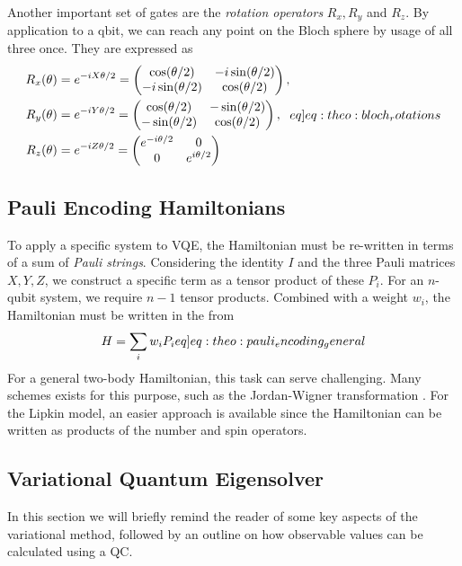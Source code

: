 Another important set of gates are the \textit{rotation operators} $R_x, R_y$ and $R_z$. By application to a qbit, we can reach any point on the Bloch sphere by usage of all three once. They are expressed as
\begin{align}
    \begin{split}
        R_x(\theta) &= \exp{-iX\theta/2} = \begin{pmatrix}
            \cos(\theta/2) & -i\sin(\theta/2) \\
            -i\sin(\theta/2) & \cos(\theta/2)
        \end{pmatrix}, \\
        R_y(\theta) &= \exp{-iY\theta/2} = \begin{pmatrix}
            \cos(\theta/2) & -\sin(\theta/2) \\
            -\sin(\theta/2) & \cos(\theta/2)
        \end{pmatrix}, \\
        R_z(\theta) &= \exp{-iZ\theta/2} = \begin{pmatrix}
            \exp{-i\theta/2} & 0 \\
            0 & \exp{i\theta/2}
        \end{pmatrix}
    \end{split}\label[eq]{eq:theo:bloch_rotations}
\end{align}

\subsection{Pauli Encoding Hamiltonians}
To apply a specific system to VQE, the Hamiltonian must be re-written in terms of a sum of \textit{Pauli strings}. Considering the identity $I$ and the three Pauli matrices $X, Y, Z$, we construct a specific term as a tensor product of these $P_i$. For an $n$-qubit system, we require $n-1$ tensor products. Combined with a weight $w_i$, the Hamiltonian must be written in the from
\begin{align}
    H = \sum_i w_i P_i \label[eq]{eq:theo:pauli_encoding_general}
\end{align}
For a general two-body Hamiltonian, this task can serve challenging. Many schemes exists for this purpose, such as the Jordan-Wigner transformation \citep{steudtnerMethodsSimulateFermions2019}. For the Lipkin model, an easier approach is available since the Hamiltonian can be written as products of the number and spin operators.


\subsection{Variational Quantum Eigensolver}
In this section we will briefly remind the reader of some key aspects of the variational method, followed by an outline on how observable values can be calculated using a QC. 


